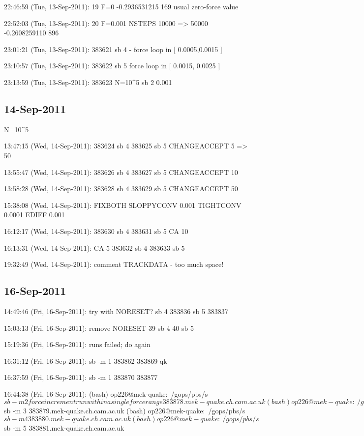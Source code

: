22:46:59 (Tue, 13-Sep-2011):
19 F=0
-0.2936531215 169  usual zero-force value 


22:52:03 (Tue, 13-Sep-2011):
	20
	F=0.001
	NSTEPS 10000 => 50000
-0.2608259110 896

23:01:21 (Tue, 13-Sep-2011):
	383621 sb 4 - force loop in [ 0.0005,0.0015 ]


23:10:57 (Tue, 13-Sep-2011):
	383622 sb 5 force loop in [ 0.0015, 0.0025 ] 


23:13:59 (Tue, 13-Sep-2011):
	383623
	N=10^5 sb 2 0.001


\subsection{14-Sep-2011}

N=10^5

13:47:15 (Wed, 14-Sep-2011):
383624 sb 4 
383625 sb 5 
CHANGEACCEPT 5 => 50

13:55:47 (Wed, 14-Sep-2011):
383626 sb 4
383627 sb 5
CHANGEACCEPT 10

13:58:28 (Wed, 14-Sep-2011):
383628 sb 4
383629 sb 5
CHANGEACCEPT 50


15:38:08 (Wed, 14-Sep-2011):
FIXBOTH
SLOPPYCONV 0.001
TIGHTCONV  0.0001
EDIFF 0.001


16:12:17 (Wed, 14-Sep-2011):
383630 sb 4
383631 sb 5
CA 10


16:13:31 (Wed, 14-Sep-2011):
CA 5
383632 sb 4
383633 sb 5

19:32:49 (Wed, 14-Sep-2011):
comment TRACKDATA - too much space!
\subsection{16-Sep-2011}

14:49:46 (Fri, 16-Sep-2011):
	try with NORESET?
	sb 4 383836
	sb 5 383837

15:03:13 (Fri, 16-Sep-2011):
	remove NORESET
	39 sb 4
	40 sb 5

15:19:36 (Fri, 16-Sep-2011):
runs failed; do again

16:31:12 (Fri, 16-Sep-2011):
	sb -m 1
	383862 383869
	qk

16:37:59 (Fri, 16-Sep-2011):
	sb -m 1
	383870 383877

16:44:38 (Fri, 16-Sep-2011):
	(bash) op226@mek-quake:~/gops/pbs/s$ sb -m 2
	force increment run within a single force range
	383878.mek-quake.ch.cam.ac.uk
	(bash) op226@mek-quake:~/gops/pbs/s$ sb -m 3
	383879.mek-quake.ch.cam.ac.uk
	(bash) op226@mek-quake:~/gops/pbs/s$ sb -m 4
	383880.mek-quake.ch.cam.ac.uk
	(bash) op226@mek-quake:~/gops/pbs/s$ sb -m 5
	383881.mek-quake.ch.cam.ac.uk

